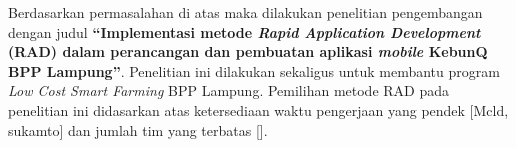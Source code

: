 \begin{flushleft}
\begin{justify}
    Berdasarkan permasalahan di atas maka dilakukan penelitian pengembangan dengan judul \textbf{“Implementasi metode \textit{Rapid Application Development} (RAD) dalam perancangan dan pembuatan aplikasi \textit{mobile} KebunQ BPP Lampung”}.  Penelitian ini dilakukan sekaligus untuk membantu program \textit{Low Cost Smart Farming} BPP Lampung. Pemilihan metode RAD pada penelitian ini didasarkan atas ketersediaan waktu pengerjaan yang pendek [Mcld, sukamto] dan jumlah tim yang terbatas [].


  \end{justify}
    

\begin{justify}
  
  



\end{justify}
\end{flushleft}
